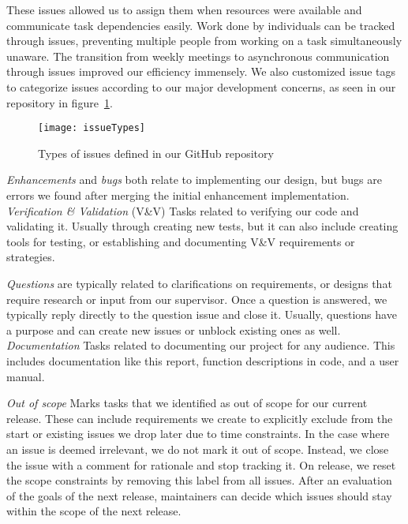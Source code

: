 These issues allowed us to assign them when resources were available and communicate task dependencies easily.
Work done by individuals can be tracked through issues,
preventing multiple people from working on a task simultaneously unaware.
The transition from weekly meetings to asynchronous communication through issues improved our efficiency immensely.
We also customized issue tags to categorize issues
according to our major development concerns, as seen in our repository in figure~\ref{fig:issueTypes}.
\begin{figure}[ht]
    \centering
    \texttt{[image: issueTypes]}
    \caption{Types of issues defined in our GitHub repository}
    \label{fig:issueTypes}
\end{figure}

\textit{Enhancements} and \textit{bugs} both relate to implementing our design,
but bugs are errors we found after merging the initial enhancement implementation.
\textit{Verification \& Validation} (V\&V) Tasks related to verifying our code and validating it.
Usually through creating new tests, but it can also include creating tools for testing,
or establishing and documenting V\&V requirements or strategies.

\textit{Questions} are typically related to clarifications on requirements,
or designs that require research or input from our supervisor.
Once a question is answered, we typically reply directly to the question issue and close it.
Usually, questions have a purpose and can create new issues or unblock existing ones as well.
\textit{Documentation} Tasks related to documenting our project for any audience.
This includes documentation like this report, function descriptions in code, and a user manual.

\textit{Out of scope} Marks tasks that we identified as out of scope for our current release.
These can include requirements we create to explicitly exclude from the start
or existing issues we drop later due to time constraints.
In the case where an issue is deemed irrelevant, we do not mark it out of scope.
Instead, we close the issue with a comment for rationale and stop tracking it.
On release, we reset the scope constraints by removing this label from all issues.
After an evaluation of the goals of the next release,
maintainers can decide which issues should stay within the scope of the next release.

